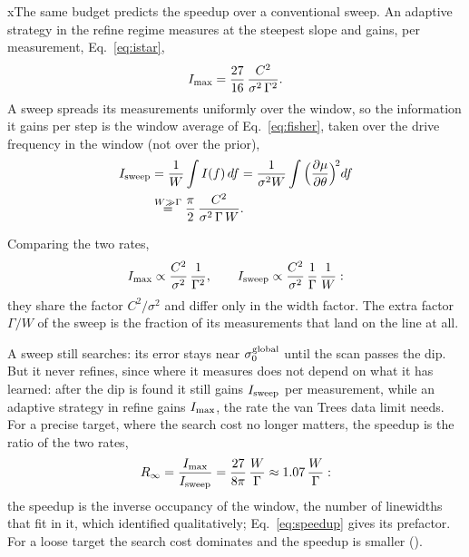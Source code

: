 xThe same budget predicts the speedup over a conventional sweep. An adaptive strategy in the refine regime measures
at the steepest slope and gains, per measurement, Eq.~\eqref{eq:istar},
\begin{equation*}
  I_{\rm max}=\frac{27}{16}\,\frac{C^2}{\sigma^2\,\Gamma^2}.
\end{equation*}
A sweep spreads its measurements uniformly over the window, so the information it gains per step is the window
average of Eq.~\eqref{eq:fisher}, taken over the drive frequency in the window (not over the prior),
\begin{equation}
  \begin{aligned}
  I_{\rm sweep}&=\frac{1}{W}\int I(f)\,df=\frac{1}{\sigma^2W}\int\Big(\frac{\partial\mu}{\partial\theta}\Big)^{\!2}df\\
  &\overset{W\gg\Gamma}{=}\frac{\pi}{2}\,\frac{C^2}{\sigma^2\,\Gamma\,W}.
  \end{aligned}
  \label{eq:sweep-info}
\end{equation}

Comparing the two rates,
\begin{equation*}
  I_{\rm max}\propto\frac{C^2}{\sigma^2}\,\frac{1}{\Gamma^2},\qquad
  I_{\rm sweep}\propto\frac{C^2}{\sigma^2}\,\frac{1}{\Gamma}\,\frac{1}{W}:
\end{equation*}
they share the factor $C^2/\sigma^2$ and differ only in the width factor. The extra factor $\Gamma/W$ of the
sweep is the fraction of its measurements that land on the line at all.

A sweep still searches: its error stays near $\sigma_0^{\rm global}$ until the scan passes the dip. But it never
refines, since where it measures does not depend on what it has learned: after the dip is found it still gains
$I_{\rm sweep}$ per measurement, while an adaptive strategy in refine gains $I_{\rm max}$, the rate the van Trees
data limit needs. For a precise target,
where the search cost no longer matters, the speedup is the ratio of the two rates,
\begin{equation}
  R_\infty=\frac{I_{\rm max}}{I_{\rm sweep}}=\frac{27}{8\pi}\,\frac{W}{\Gamma}\approx1.07\,\frac{W}{\Gamma}:
  \label{eq:speedup}
\end{equation}
the speedup is the inverse occupancy of the window, the number of linewidths that fit in it, which
\citet{dushenko2020sbed} identified qualitatively; Eq.~\eqref{eq:speedup} gives its prefactor. For a loose target the search cost
dominates and the speedup is smaller ().

